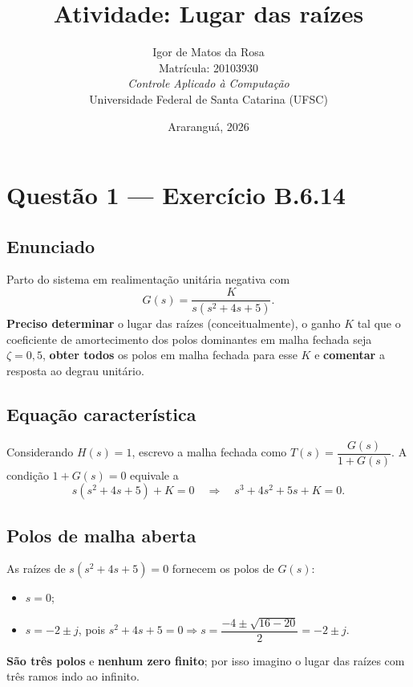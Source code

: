 \documentclass[11pt,a4paper]{article}
\title{\textbf{Atividade: Lugar das raízes}}
\author{
  Igor de Matos da Rosa\\
  Matrícula: 20103930\\[0.5em]
  \textit{Controle Aplicado à Computação}\\
  Universidade Federal de Santa Catarina (UFSC)
}
\date{Araranguá, 2026}
\begin{document}
\maketitle

\section*{Questão 1 --- Exercício B.6.14}

\subsection*{Enunciado}

Parto do sistema em realimentação unitária negativa com
\begin{equation}
  G(s)=\frac{K}{s(s^2+4s+5)} .
\end{equation}
\textbf{Preciso determinar} o lugar das raízes (conceitualmente), o ganho $K$ tal que o coeficiente de amortecimento dos polos dominantes em malha fechada seja $\zeta=0{,}5$, \textbf{obter todos} os polos em malha fechada para esse $K$ e \textbf{comentar} a resposta ao degrau unitário.

\subsection*{Equação característica}

Considerando $H(s)=1$, escrevo a malha fechada como $T(s)=\dfrac{G(s)}{1+G(s)}$. A condição $1+G(s)=0$ equivale a
\begin{equation}
  s(s^2+4s+5)+K=0
  \quad\Longrightarrow\quad
  s^3+4s^2+5s+K=0 .
\end{equation}

\subsection*{Polos de malha aberta}

As raízes de $s(s^2+4s+5)=0$ fornecem os polos de $G(s)$:
\begin{itemize}
  \item $s=0$;
  \item $s=-2\pm j$, pois $s^2+4s+5=0 \Rightarrow s=\dfrac{-4\pm\sqrt{16-20}}{2}=-2\pm j$.
\end{itemize}
\textbf{São três polos} e \textbf{nenhum zero finito}; por isso imagino o lugar das raízes com três ramos indo ao infinito.
\end{document}
